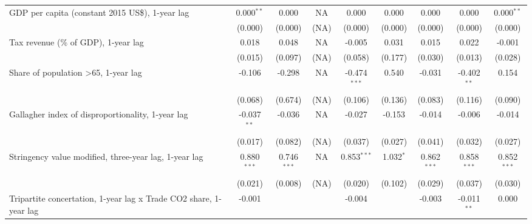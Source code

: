\begin{table}[htbp]
\begin{tabular}{lcccccccc}
      GDP per capita (constant 2015 US\$), 1-year lag                   & 0.000$^{**}$  & 0.000                     & NA           & 0.000          & 0.000            & 0.000           & 0.000           & 0.000$^{**}$\\   
                                                                        & (0.000)       & (0.000)                   & (NA)         & (0.000)        & (0.000)          & (0.000)         & (0.000)         & (0.000)\\   
      Tax revenue (\% of GDP), 1-year lag                               & 0.018         & 0.048                     & NA           & -0.005         & 0.031            & 0.015           & 0.022           & -0.001\\   
                                                                        & (0.015)       & (0.097)                   & (NA)         & (0.058)        & (0.177)          & (0.030)         & (0.013)         & (0.028)\\   
      Share of population >65, 1-year lag                               & -0.106        & -0.298                    & NA           & -0.474$^{***}$ & 0.540            & -0.031          & -0.402$^{**}$   & 0.154\\   
                                                                        & (0.068)       & (0.674)                   & (NA)         & (0.106)        & (0.136)          & (0.083)         & (0.116)         & (0.090)\\   
      Gallagher index of disproportionality, 1-year lag                 & -0.037$^{**}$ & -0.036                    & NA           & -0.027         & -0.153           & -0.014          & -0.006          & -0.014\\   
                                                                        & (0.017)       & (0.082)                   & (NA)         & (0.037)        & (0.027)          & (0.041)         & (0.032)         & (0.027)\\   
      Stringency value modified, three-year lag, 1-year lag             & 0.880$^{***}$ & 0.746$^{***}$             & NA           & 0.853$^{***}$  & 1.032$^{*}$      & 0.862$^{***}$   & 0.858$^{***}$   & 0.852$^{***}$\\   
                                                                        & (0.021)       & (0.008)                   & (NA)         & (0.020)        & (0.102)          & (0.029)         & (0.037)         & (0.030)\\   
      Tripartite concertation, 1-year lag x Trade CO2 share, 1-year lag & -0.001        &                           &              & -0.004         &                  & -0.003          & -0.011$^{**}$   & 0.000\\   

\end{tabular}
\end{table}

